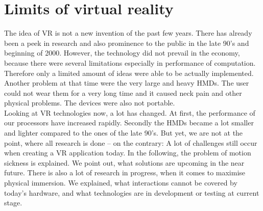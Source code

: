 \section{Limits of virtual reality} \label{limits}
The idea of VR is not a new invention of the past few years. There has already been a peek in research and also prominence to the public in the late 90's and beginning of 2000. However, the technology did not prevail in the economy, because there were several limitations especially in performance of computation. Therefore only a limited amount of ideas were able to be actually implemented. Another problem at that time were the very large and heavy HMDs. The user could not wear them for a very long time and it caused neck pain and other physical problems. The devices were also not portable. \cite{Jerald.2016}\\
Looking at VR technologies now, a lot has changed. At first, the performance of our processors have increased rapidly. Secondly the HMDs became a lot smaller and lighter compared to the ones of the late 90's. But yet, we are not at the point, where all research is done -- on the contrary: A lot of challenges still occur when creating a VR application today. In the following, the problem of motion sickness is explained. We point out, what solutions are upcoming in the near future. There is also a lot of research in progress, when it comes to maximise physical immersion. We explained, what interactions cannot be covered by today's hardware, and what technologies are in development or testing at current stage.
